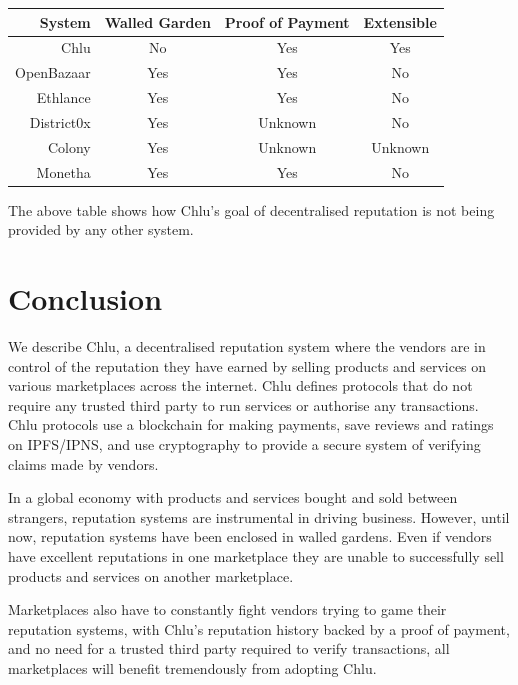 \documentclass[a4paper]{article}
\begin{document}
\begin{center}
\begin{tabular}{ | r | c | c | c | }
  \hline
  System & Walled Garden & Proof of Payment & Extensible \\
  \hline

  Chlu & No & Yes & Yes \\

  \hline

  OpenBazaar\cite{openbazaar} & Yes & Yes & No \\

  \hline

  Ethlance\cite{ethlance} & Yes & Yes & No \\

  \hline

  District0x\cite{district0x} & Yes & Unknown & No \\

  \hline

  Colony\cite{colony} & Yes & Unknown & Unknown \\

  \hline

  Monetha\cite{monetha} & Yes & Yes & No \\

  \hline
\end{tabular}
\end{center}

The above table shows how Chlu's goal of decentralised reputation is
not being provided by any other system.

\section{Conclusion}

We describe Chlu, a decentralised reputation system where the vendors
are in control of the reputation they have earned by selling products
and services on various marketplaces across the internet. Chlu defines
protocols that do not require any trusted third party to run services
or authorise any transactions. Chlu protocols use a blockchain for
making payments, save reviews and ratings on IPFS/IPNS, and use
cryptography to provide a secure system of verifying claims made by
vendors.

In a global economy with products and services bought and sold between
strangers, reputation systems are instrumental in driving
business. However, until now, reputation systems have been enclosed in
walled gardens. Even if vendors have excellent reputations in one
marketplace they are unable to successfully sell products and services
on another marketplace.

Marketplaces also have to constantly fight vendors trying to game
their reputation systems, with Chlu's reputation history backed by a
proof of payment, and no need for a trusted third party required to
verify transactions, all marketplaces will benefit tremendously from
adopting Chlu.

{}

\end{document}
